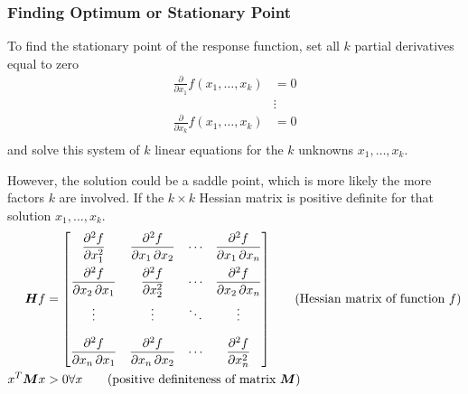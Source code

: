 \documentclass[11pt]{article}
\theoremstyle{definition}
\begin{document}
\subsubsection{Finding Optimum or Stationary Point}
To find the stationary point of the response function, set all $k$ partial derivatives equal to zero
\begin{align*}
	\frac{\partial}{\partial x_1}f(x_1,\dots,x_k) &= 0\\
	&\vdots\\
	\frac{\partial}{\partial x_k}f(x_1,\dots,x_k) &= 0\\
\end{align*}
and solve this system of $k$ linear equations for the $k$ unknowns $x_1,\dots,x_k$.

However, the solution could be a saddle point, which is more likely the more factors $k$ are involved. If the $k\times k$ Hessian matrix is positive definite for that solution $x_1,\dots,x_k$.
\begin{align*}
	\bm{H} f &= {\begin{bmatrix}{\dfrac {\partial ^{2}f}{\partial x_{1}^{2}}}&{\dfrac {\partial ^{2}f}{\partial x_{1}\,\partial x_{2}}}&\cdots &{\dfrac {\partial ^{2}f}{\partial x_{1}\,\partial x_{n}}}\\[2.2ex]{\dfrac {\partial ^{2}f}{\partial x_{2}\,\partial x_{1}}}&{\dfrac {\partial ^{2}f}{\partial x_{2}^{2}}}&\cdots &{\dfrac {\partial ^{2}f}{\partial x_{2}\,\partial x_{n}}}\\[2.2ex]\vdots &\vdots &\ddots &\vdots \\[2.2ex]{\dfrac {\partial ^{2}f}{\partial x_{n}\,\partial x_{1}}}&{\dfrac {\partial ^{2}f}{\partial x_{n}\,\partial x_{2}}}&\cdots &{\dfrac {\partial ^{2}f}{\partial x_{n}^{2}}}\end{bmatrix}} \tag{Hessian matrix of function $f$}\\
	x^T\bm{M}x &> 0 \forall x \tag{positive definiteness of matrix $\bm{M}$}
\end{align*}

\clearpage
\appendix
\end{document}
